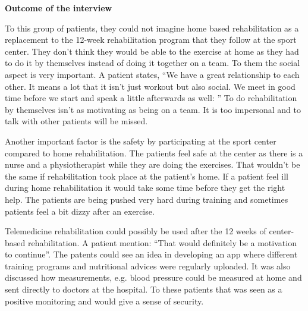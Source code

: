\textbf{Outcome of the interview}

To this group of patients, they could not imagine home based rehabilitation as a replacement to the 12-week rehabilitation program that they follow at the sport center. They don’t think they would be able to the exercise at home as they had to do it by themselves instead of doing it together on a team. To them the social aspect is very important. A patient states, “We have a great relationship to each other. It means a lot that it isn’t just workout but also social. We meet in good time before we start and speak a little afterwards as well: ”  To do rehabilitation by themselves isn’t as motivating as being on a team. It is too impersonal and to talk with other patients will be missed. 

Another important factor is the safety by participating at the sport center compared to home rehabilitation. The patients feel safe at the center as there is a nurse and a physiotherapist while they are doing the exercises. That wouldn’t be the same if rehabilitation took place at the patient’s home. If a patient feel ill during home rehabilitation it would take some time before they get the right help. The patients are being pushed very hard during training and sometimes patients feel a bit dizzy after an exercise. 

Telemedicine rehabilitation could possibly be used after the 12 weeks of center-based rehabilitation. A patient mention: “That would definitely be a motivation to continue”. The patents could see an idea in developing an app where different training programs and nutritional advices were regularly uploaded. It was also discussed how measurements, e.g. blood pressure could be measured at home and sent directly to doctors at the hospital. To these patients that was seen as a positive monitoring and would give a sense of security.  

